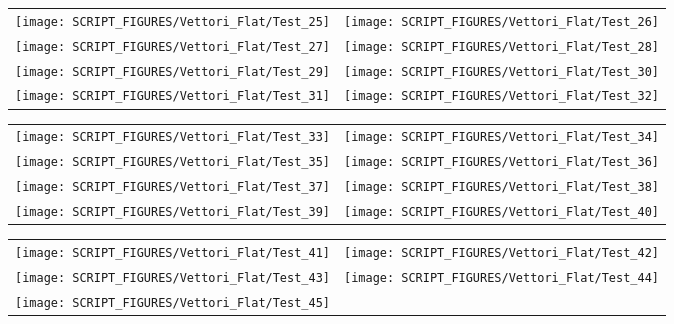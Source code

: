 \begin{figure}[!ht]
\begin{tabular*}{\textwidth}{l@{\extracolsep{\fill}}r}
\texttt{[image: SCRIPT\_FIGURES/Vettori\_Flat/Test\_25]} &
\texttt{[image: SCRIPT\_FIGURES/Vettori\_Flat/Test\_26]} \\
\texttt{[image: SCRIPT\_FIGURES/Vettori\_Flat/Test\_27]} &
\texttt{[image: SCRIPT\_FIGURES/Vettori\_Flat/Test\_28]} \\
\texttt{[image: SCRIPT\_FIGURES/Vettori\_Flat/Test\_29]} &
\texttt{[image: SCRIPT\_FIGURES/Vettori\_Flat/Test\_30]} \\
\texttt{[image: SCRIPT\_FIGURES/Vettori\_Flat/Test\_31]} &
\texttt{[image: SCRIPT\_FIGURES/Vettori\_Flat/Test\_32]} \\
\end{tabular*}
\label{Vettori_4}
\end{figure}

\begin{figure}[!ht]
\begin{tabular*}{\textwidth}{l@{\extracolsep{\fill}}r}
\texttt{[image: SCRIPT\_FIGURES/Vettori\_Flat/Test\_33]} &
\texttt{[image: SCRIPT\_FIGURES/Vettori\_Flat/Test\_34]} \\
\texttt{[image: SCRIPT\_FIGURES/Vettori\_Flat/Test\_35]} &
\texttt{[image: SCRIPT\_FIGURES/Vettori\_Flat/Test\_36]} \\
\texttt{[image: SCRIPT\_FIGURES/Vettori\_Flat/Test\_37]} &
\texttt{[image: SCRIPT\_FIGURES/Vettori\_Flat/Test\_38]} \\
\texttt{[image: SCRIPT\_FIGURES/Vettori\_Flat/Test\_39]} &
\texttt{[image: SCRIPT\_FIGURES/Vettori\_Flat/Test\_40]} \\
\end{tabular*}
\label{Vettori_5}
\end{figure}

\begin{figure}[!ht]
\begin{tabular*}{\textwidth}{l@{\extracolsep{\fill}}r}
\texttt{[image: SCRIPT\_FIGURES/Vettori\_Flat/Test\_41]} &
\texttt{[image: SCRIPT\_FIGURES/Vettori\_Flat/Test\_42]} \\
\texttt{[image: SCRIPT\_FIGURES/Vettori\_Flat/Test\_43]} &
\texttt{[image: SCRIPT\_FIGURES/Vettori\_Flat/Test\_44]} \\
\texttt{[image: SCRIPT\_FIGURES/Vettori\_Flat/Test\_45]} \\
\end{tabular*}
\label{Vettori_6}
\end{figure}

